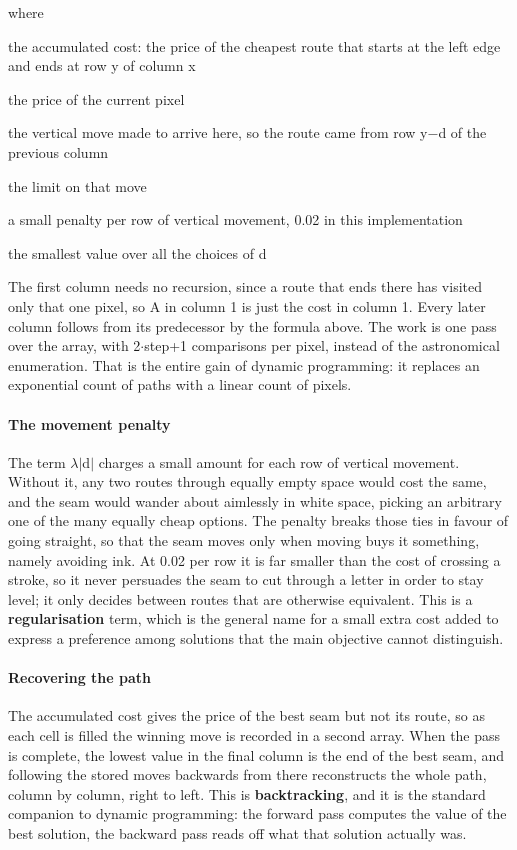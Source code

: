 \noindent where
\begin{description}[leftmargin=2.4em,style=nextline,font=\normalfont\ttfamily]\setlength\itemsep{1pt}
  \item[{$A[y,x]$}] \normalfont the accumulated cost: the price of the cheapest route that starts at the left edge and ends at row y of column x
  \item[{$\mathrm{cost}[y,x]$}] \normalfont the price of the current pixel
  \item[{$d$}] \normalfont the vertical move made to arrive here, so the route came from row y$-$d of the previous column
  \item[{$\mathrm{step}$}] \normalfont the limit on that move
  \item[{$\lambda$}] \normalfont a small penalty per row of vertical movement, 0.02 in this implementation
  \item[{$\min$}] \normalfont the smallest value over all the choices of d
\end{description}
The first column needs no recursion, since a route that ends there has visited only that one pixel, so A in column 1 is just the cost in column 1. Every later column follows from its predecessor by the formula above. The work is one pass over the array, with 2$\cdot$step+1 comparisons per pixel, instead of the astronomical enumeration. That is the entire gain of dynamic programming: it replaces an exponential count of paths with a linear count of pixels.


\paragraph{The movement penalty}
The term $\lambda$$|$d$|$ charges a small amount for each row of vertical movement. Without it, any two routes through equally empty space would cost the same, and the seam would wander about aimlessly in white space, picking an arbitrary one of the many equally cheap options. The penalty breaks those ties in favour of going straight, so that the seam moves only when moving buys it something, namely avoiding ink. At 0.02 per row it is far smaller than the cost of crossing a stroke, so it never persuades the seam to cut through a letter in order to stay level; it only decides between routes that are otherwise equivalent. This is a \textbf{regularisation} term, which is the general name for a small extra cost added to express a preference among solutions that the main objective cannot distinguish.


\paragraph{Recovering the path}
The accumulated cost gives the price of the best seam but not its route, so as each cell is filled the winning move is recorded in a second array. When the pass is complete, the lowest value in the final column is the end of the best seam, and following the stored moves backwards from there reconstructs the whole path, column by column, right to left. This is \textbf{backtracking}, and it is the standard companion to dynamic programming: the forward pass computes the value of the best solution, the backward pass reads off what that solution actually was.


